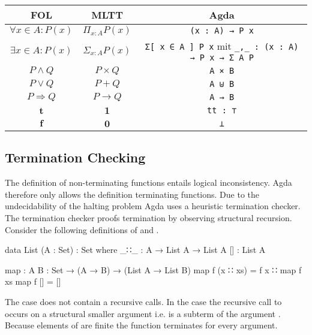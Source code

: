 \documentclass[10pt,a4paper,twoside]{report}
\begin{document}
\begin{center}
  \begin{tabular}{ccc}
    FOL & MLTT & Agda \\\hline
    $\forall x \in A: P(x)$ & $\Pi_{x:A}P(x)$ & \texttt{(x : A) → P x} \\
    $\exists x \in A: P(x)$ & $\Sigma_{x:A} P(x)$ & \texttt{Σ[ x ∈ A ] P x} mit \texttt{_,_ : (x : A) → P x → Σ A P} \\
    $P \wedge Q$ & $P \times Q$ & \texttt{A × B} \\
    $P \vee Q$ & $P + Q$ & \texttt{A ⊎ B} \\
    $P \Rightarrow Q$ & $P \rightarrow Q$ & \texttt{A → B} \\
    $\mathbf t$ & $\mathbf 1$ & \texttt{tt : ⊤} \\
    $\mathbf f$ & $\mathbf 0$ & \texttt{⊥}
  \end{tabular}
\end{center}

\subsection{Termination Checking}
\label{sec:termination-checking}

The definition of non-terminating functions entails logical inconsistency.
Agda therefore only allows the definition terminating functions.
Due to the undecidability of the halting problem Agda uses a heuristic
termination checker.
The termination checker proofs termination by observing structural recursion.
Consider the following definitions of  and
.

\begin{code}
data List (A : Set) : Set where
  _∷_  : A → List A → List A
  []   : List A

map : {A B : Set} → (A → B) → (List A → List B)
map f (x ∷ xs)  = f x ∷ map f xs
map f []        = []
\end{code}
The \AgdaInductiveConstructor{[]} case does not contain a recursive calls.
In the  case the recursive call to
 occurs on a structural smaller argument i.e.
 is a subterm of the argument
\;\;.
Because elements of  are finite the function
 terminates for every argument.
\end{document}
